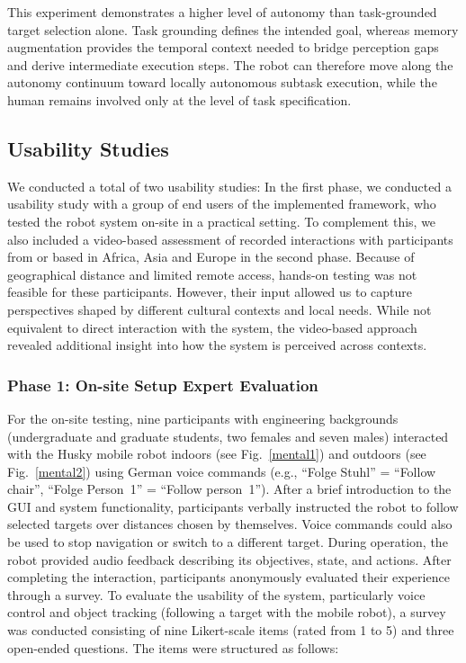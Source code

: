 \documentclass[lettersize,journal]{IEEEtran}
\begin{document}
This experiment demonstrates a higher level of autonomy than task-grounded target selection alone. Task grounding defines the intended goal, whereas memory augmentation provides the temporal context needed to bridge perception gaps and derive intermediate execution steps. The robot can therefore move along the autonomy continuum toward locally autonomous subtask execution, while the human remains involved only at the level of task specification.

\subsection{Usability Studies}
We conducted a total of two usability studies:
In the first phase, we conducted a usability study with a group of end users of the implemented framework, who tested the robot system on-site in a practical setting. To complement this, we also included a video-based assessment of recorded interactions with participants from or based in Africa, Asia and Europe in the second phase. Because of geographical distance and limited remote access, hands-on testing was not feasible for these participants. However, their input allowed us to capture perspectives shaped by different cultural contexts and local needs. While not equivalent to direct interaction with the  system, the video-based approach revealed additional insight into how the system is perceived across contexts.

\subsubsection{Phase 1: On-site Setup Expert Evaluation}

For the on-site testing, nine participants  with  engineering backgrounds (undergraduate and graduate students, two females and seven males) interacted with the Husky mobile robot indoors (see Fig.~\ref{mental1}) and outdoors (see Fig.~\ref{mental2}) using German voice commands (e.g., ``Folge Stuhl'' = ``Follow chair'', ``Folge Person~1'' = ``Follow person~1''). After a brief introduction to the GUI and system functionality, participants verbally instructed the robot to follow selected targets over distances chosen by themselves. Voice commands could also be used to stop navigation or switch to a different target. During operation, the robot provided audio feedback describing its objectives, state, and actions. After completing the interaction, participants anonymously evaluated their experience through a survey.
To evaluate the usability of the system, particularly voice control and object tracking (following a target with the mobile robot), a survey was conducted consisting of nine Likert-scale items (rated from 1 to 5) and three open-ended questions. The items were structured as follows:
\end{document}
